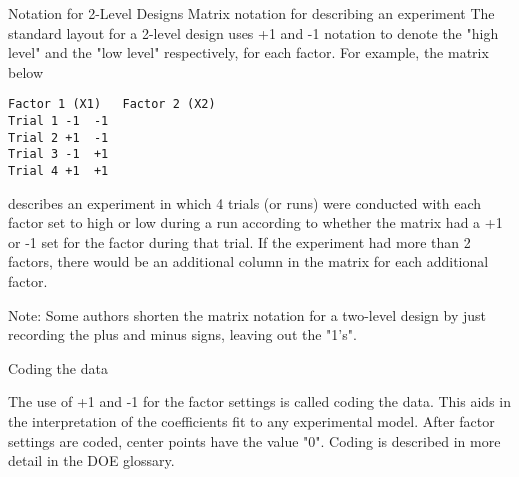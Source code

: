 
Notation for 2-Level Designs
Matrix notation for describing an experiment	The standard layout for a 2-level design uses +1 and -1 notation to denote the "high level" and the "low level" respectively, for each factor. For example, the matrix below
\begin{verbatim}
Factor 1 (X1)	Factor 2 (X2)
Trial 1	-1	-1
Trial 2	+1	-1
Trial 3	-1	+1
Trial 4	+1	+1
\end{verbatim}
describes an experiment in which 4 trials (or runs) were conducted with each factor set to high or low during a run according to whether the matrix had a +1 or -1 set for the factor during that trial. If the experiment had more than 2 factors, there would be an additional column in the matrix for each additional factor.

Note: Some authors shorten the matrix notation for a two-level design by just recording the plus and minus signs, leaving out the "1's".

Coding the data

The use of +1 and -1 for the factor settings is called coding the data. This aids in the interpretation of the coefficients fit to any experimental model. After factor settings are coded, center points have the value "0". Coding is described in more detail in the DOE glossary.

